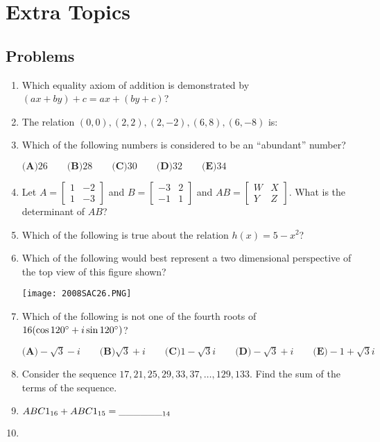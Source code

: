 \documentclass[../uilmath.tex]{subfiles}
\begin{document}
\chapter{Extra Topics}
\section*{Problems}
\begin{enumerate}[label=\bfseries\arabic*.]
    \item %
    Which equality axiom of addition is demonstrated by $(ax+by)+c=ax+(by+c)$?

    \item %
    The relation ${(0,0), (2,2), (2,-2), (6,8), (6,-8)}$ is:

    \item %
    Which of the following numbers is considered to be an ``abundant'' number?

    $\textbf{(A)} 26 \qquad \textbf{(B)} 28 \qquad \textbf{(C)} 30 \qquad \textbf{(D)} 32 \qquad \textbf{(E)} 34$

    \item %
    Let $A = \begin{bmatrix}
    1  & -2\\
    1 & -3
    \end{bmatrix}$ and $B=\begin{bmatrix}
        -3 & 2\\
        -1 & 1 
    \end{bmatrix}$ and $AB = \begin{bmatrix}
        W & X \\
        Y & Z
    \end{bmatrix}$. What is the determinant of $AB$?

    \item %
    Which of the following is true about the relation $h(x)=5-x^2$?

    \item %
    Which of the following would best represent a two dimensional perspective of the top view of this figure shown?
    \begin{center}
        \texttt{[image: 2008SAC26.PNG]}
    \end{center}

    \item %
    Which of the following is not one of the fourth roots of $16(\cos 120\degree + i\sin 120\degree)$?

    $\textbf{(A)} -\sqrt{3}-i \qquad \textbf{(B)} \sqrt{3}+i \qquad \textbf{(C)} 1-\sqrt{3}i \qquad \textbf{(D)} -\sqrt{3}+i \qquad \textbf{(E)} -1+\sqrt{3}i$

    \item %
    Consider the sequence $17,21,25,29,33,37,\dots,129,133$. Find the sum of the terms of the sequence.

    \item %
    $ABC1_{16}+ABC1_{15}=\_\_\_\_\_\__{14}$

    \item %
    
\end{enumerate}
\end{document}

